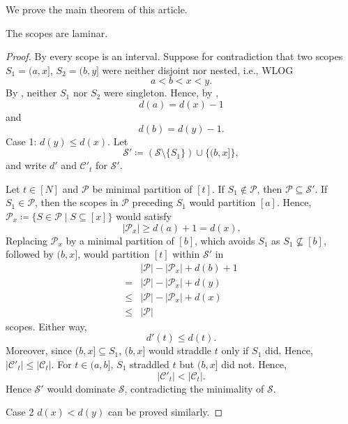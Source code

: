 We prove the main theorem of this article.
\begin{theorem}\label{thm:forest}
    The scopes are laminar.
\end{theorem}
\begin{proof}
    By  every scope is an interval. Suppose for contradiction that two scopes $S_1=(a,x]$, $S_2=(b,y]$ were neither disjoint nor nested, i.e., WLOG
    \begin{equation} \label{eqn:no-singleton}
        a<b<x<y.
    \end{equation}
    By , neither $S_1$ nor $S_2$ were singleton. Hence, by ,
    \begin{equation*}
        d(a)=d(x)-1
    \end{equation*}
    and
    \begin{equation*}
        d(b)=d(y)-1.
    \end{equation*}
    Case 1: $d(y)\leq d(x)$. Let
    \begin{equation*}
        \mathcal{S}'\coloneqq(\mathcal{S}\setminus\{S_1\})\cup\{(b,x]\},
    \end{equation*}
    and write $d'$ and $\mathcal{C}'_t$ for $\mathcal{S}'$.

    Let $t\in[N]$ and $\mathcal{P}$ be minimal partition of $[t]$. If $S_1\notin\mathcal{P}$, then $\mathcal{P}\subseteq\mathcal{S}'$. If $S_1\in\mathcal{P}$, then the scopes in $\mathcal{P}$ preceding $S_1$ would partition $[a]$. Hence, $\mathcal{P}_x\coloneqq\{S\in\mathcal{P}\mid S\subseteq[x]\}$ would satisfy
    \begin{equation*}
        \lvert\mathcal{P}_x\rvert\geq d(a)+1=d(x).
    \end{equation*}
    Replacing $\mathcal{P}_x$ by a minimal partition of $[b]$, which avoids $S_1$ as $S_1\not\subseteq[b]$, followed by $(b,x]$, would partition $[t]$ within $\mathcal{S}'$ in
    \begin{align*}
        &\lvert\mathcal{P}\rvert-\lvert\mathcal{P}_x\rvert+d(b)+1\\
        =&\lvert\mathcal{P}\rvert-\lvert\mathcal{P}_x\rvert+d(y)\\
        \leq&\lvert\mathcal{P}\rvert-\lvert\mathcal{P}_x\rvert+d(x)\\
        \leq&\lvert\mathcal{P}\rvert
    \end{align*}
    scopes. Either way,
    \begin{equation*}
        d'(t)\leq d(t).
    \end{equation*}
    Moreover, since $(b,x]\subseteq S_1$, $(b,x]$ would straddle $t$ only if $S_1$ did. Hence, $\lvert\mathcal{C}'_t\rvert\leq\lvert\mathcal{C}_t\rvert$. For $t\in(a,b]$, $S_1$ straddled $t$ but $(b,x]$ did not. Hence,
    \begin{equation*}
        \lvert\mathcal{C}'_t\rvert<\lvert\mathcal{C}_t\rvert.
    \end{equation*}
    Hence $\mathcal{S}'$ would dominate $\mathcal{S}$, contradicting the minimality of $\mathcal{S}$.

    Case 2 $d(x)<d(y)$ can be proved similarly.
\end{proof}